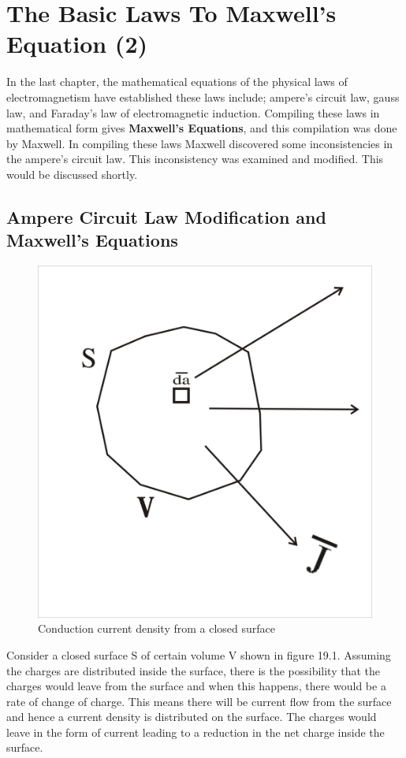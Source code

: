 \chapter{The Basic Laws To Maxwell's Equation (2)}
In the last chapter, the mathematical equations of the physical laws of electromagnetism have established these laws include; ampere's circuit law, gauss law, and Faraday's law of electromagnetic induction. Compiling these laws in mathematical form gives \textbf{Maxwell's Equations}, and this compilation was done by Maxwell. In compiling these laws Maxwell discovered some inconsistencies in the ampere's circuit law. This inconsistency was examined and modified. This would be discussed shortly.

\section{Ampere Circuit Law Modification and Maxwell's Equations}
\begin{figure}[h]
\centering
\includegraphics[width=.7\linewidth]{./graphics/closedsurface}
\caption{Conduction current density from a closed surface}
\end{figure}

Consider a closed surface S of certain volume V shown in figure 19.1. Assuming the charges are distributed inside the surface, there is the possibility that the charges would leave from the surface and when this happens, there would be a rate of change of charge. This means there will be current flow from the surface and hence a current density is distributed on the surface. The charges would leave in the form of current leading to a reduction in the net charge inside the surface.

